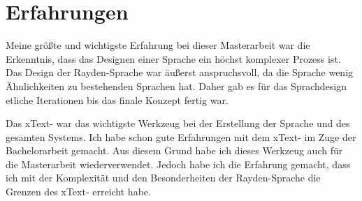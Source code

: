 \section{Erfahrungen}

Meine größte und wichtigste Erfahrung bei dieser Masterarbeit war die Erkenntnis, dass das Designen einer Sprache ein höchst komplexer Prozess ist. Das Design der Rayden-Sprache war äußerst anspruchsvoll, da die Sprache wenig Ähnlichkeiten zu bestehenden Sprachen hat. Daher gab es für das Sprachdesign etliche Iterationen bis das finale Konzept fertig war.

\SuperPar
Das xText- war das wichtigste Werkzeug bei der Erstellung der Sprache und des gesamten Systems. Ich habe schon gute Erfahrungen mit dem xText- im Zuge der Bachelorarbeit gemacht. Aus diesem Grund habe ich dieses Werkzeug auch für die Masterarbeit wiederverwendet. Jedoch habe ich die Erfahrung gemacht, dass ich mit der Komplexität und den Besonderheiten der Rayden-Sprache die Grenzen des xText- erreicht habe.
